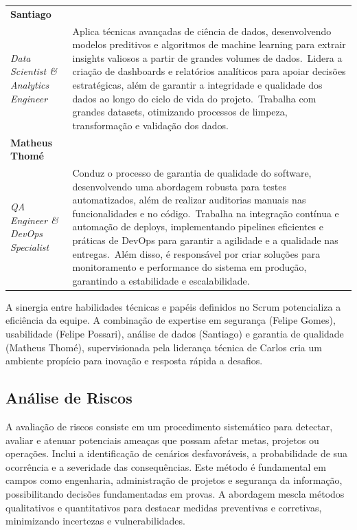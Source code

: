\documentclass[a5paper, 12pt]{article}
\begin{document}
\begin{longtable}[c]{@{} >{\raggedright\arraybackslash}p{4.5cm}>{\raggedright\arraybackslash}p{11cm} @{}}
\textbf{Santiago} \\ \textit{Data Scientist \& Analytics Engineer} &
  Aplica técnicas avançadas de ciência de dados, desenvolvendo modelos preditivos e algoritmos de machine learning para extrair insights valiosos a partir de grandes volumes de dados.\
  Lidera a criação de dashboards e relatórios analíticos para apoiar decisões estratégicas, além de garantir a integridade e qualidade dos dados ao longo do ciclo de vida do projeto.\
  Trabalha com grandes datasets, otimizando processos de limpeza, transformação e validação dos dados. \\

\textbf{Matheus Thomé} \\ \textit{QA Engineer \& DevOps Specialist} &
  Conduz o processo de garantia de qualidade do software, desenvolvendo uma abordagem robusta para testes automatizados, além de realizar auditorias manuais nas funcionalidades e no código.\
  Trabalha na integração contínua e automação de deploys, implementando pipelines eficientes e práticas de DevOps para garantir a agilidade e a qualidade nas entregas.\
  Além disso, é responsável por criar soluções para monitoramento e performance do sistema em produção, garantindo a estabilidade e escalabilidade. \\

\end{longtable}

A sinergia entre habilidades técnicas e papéis definidos no Scrum potencializa a eficiência da equipe. A combinação de expertise em segurança (Felipe Gomes), usabilidade (Felipe Possari), análise de dados (Santiago) e garantia de qualidade (Matheus Thomé), supervisionada pela liderança técnica de Carlos cria um ambiente propício para inovação e resposta rápida a desafios.


\subsection{Análise de Riscos}

A avaliação de riscos consiste em um procedimento sistemático para detectar, avaliar e atenuar potenciais ameaças que possam afetar metas, projetos ou operações. Inclui a identificação de cenários desfavoráveis, a probabilidade de sua ocorrência e a severidade das consequências. Este método é fundamental em campos como engenharia, administração de projetos e segurança da informação, possibilitando decisões fundamentadas em provas. A abordagem mescla métodos qualitativos e quantitativos para destacar medidas preventivas e corretivas, minimizando incertezas e vulnerabilidades.
\end{document}

